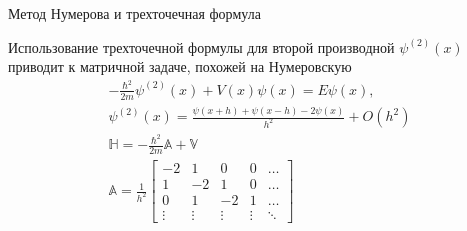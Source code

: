 \documentclass[10pt,pdf,hyperref={unicode},xcolor=dvipsnames]{beamer}
\newcommand{\bbA}{\mathbb{A}}
\newcommand{\bbV}{\mathbb{V}}
\newcommand{\bbH}{\mathbb{H}}
\newcommand{\psip}[1]{\psi^{(#1)}(x)}
\begin{document}
\begin{frame}{Метод Нумерова и трехточечная формула}
    \begin{block}{}
        Использование трехточечной формулы для второй производной $\psip{2}$ приводит к матричной задаче, похожей на Нумеровскую 
        \begin{gather}
            -\frac{ \hbar^2 }{ 2m } \psip{2} + V(x) \psi(x) = E \psi(x), \\
            \psip{2} = \frac{\psi(x+h) + \psi(x-h) - 2\psi(x)}{h^2} + O(h^2) \\
            \bbH = - \frac{\hbar^2}{2m} \bbA + \bbV \\
            \bbA = \frac{1}{h^2} 
            \begin{bmatrix}
                -2 & 1 & 0 & 0 & \dots \\
                1 & -2 & 1 & 0 & \dots \\
                0 & 1 & -2 & 1 & \dots \\
                \vdots & \vdots & \vdots & \vdots & \ddots
            \end{bmatrix}
        \end{gather}
    \end{block}
\end{frame}
\end{document}
